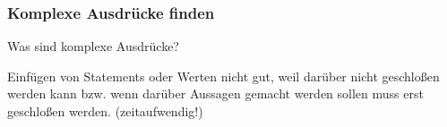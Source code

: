 \subsubsection{Komplexe Ausdrücke finden}
Was sind komplexe Ausdrücke?

Einfügen von Statements oder Werten nicht gut, weil darüber nicht geschloßen werden kann bzw. wenn darüber Aussagen gemacht werden sollen muss erst geschloßen werden. (zeitaufwendig!)